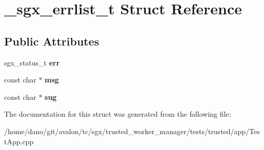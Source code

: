 \hypertarget{struct__sgx__errlist__t}{}\section{\+\_\+sgx\+\_\+errlist\+\_\+t Struct Reference}
\label{struct__sgx__errlist__t}
\subsection*{Public Attributes}
\begin{DoxyCompactItemize}
\item 
\mbox{\label{struct__sgx__errlist__t_a35c50c64b71cf15cf96197ea8a28c3bd}} 
sgx\+\_\+status\+\_\+t {\bfseries err}
\item 
\mbox{\label{struct__sgx__errlist__t_ae718e729383388ca41bb7d69bf560669}} 
const char $\ast$ {\bfseries msg}
\item 
\mbox{\label{struct__sgx__errlist__t_a93545de6afcf5b4531df73696b3e96ce}} 
const char $\ast$ {\bfseries sug}
\end{DoxyCompactItemize}


The documentation for this struct was generated from the following file\+:\begin{DoxyCompactItemize}
\item 
/home/dano/git/avalon/tc/sgx/trusted\+\_\+worker\+\_\+manager/tests/trusted/app/Test\+App.\+cpp\end{DoxyCompactItemize}
